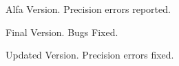
Alfa Version. Precision errors reported.


Final Version. Bugs Fixed.


Updated Version. Precision errors fixed. 